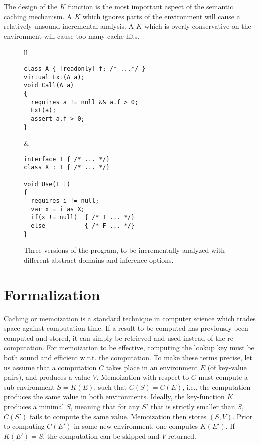 \documentclass{llncs}
\begin{document}
The design of the $K$ function is the most important aspect of the semantic caching mechanism.
A $K$ which ignores parts of the environment will cause a relatively unsound incremental analysis.
A $K$ which is overly-conservative on the environment will cause too many cache hits.


\begin{figure*}[t]
\centering
\begin{tabular}{ll}
\begin{lstlisting}
class A { [readonly] f; /* ...*/ }
virtual Ext(A a);
void Call(A a)
{  
  requires a != null && a.f > 0;
  Ext(a);
  assert a.f > 0;
}
\end{lstlisting} 
& \hspace{.5cm}
\begin{lstlisting}
interface I { /* ... */}
class X : I { /* ... */}

void Use(I i)
{
  requires i != null;
  var x = i as X; 
  if(x != null)  { /* T ... */}
  else           { /* F ... */}   
}
\end{lstlisting} 
\end{tabular}
\caption{Three versions of the program, to be incrementally analyzed with different abstract domains and inference options.}
\label{fig:ex2}
\end{figure*}



\section{Formalization}
Caching or memoization is a standard technique in computer science
which trades space against computation time. If a result to be
computed has previously been computed and stored, it can simply be
retrieved and used instead of the re-computation. For memoization to
be effective, computing the lookup key must be both sound and
efficient w.r.t. the computation. To make these terms precise, let us
assume that a computation $C$ takes place in an environment $E$ (of
key-value pairs), and produces a value $V$. Memoization with respect
to $C$ must compute a sub-environment $S= K(E)$, such that $C(S) =
C(E)$, i.e., the computation produces the same value in both
environments. Ideally, the key-function $K$ produces a minimal $S$,
meaning that for any $S'$ that is strictly smaller than $S$, $C(S')$
fails to compute the same value. Memoization then stores $(S,V)$.
Prior to computing $C(E')$ in some new environment, one computes
$K(E')$. If $K(E') = S$, the computation can be skipped and $V$
returned.
\end{document}
